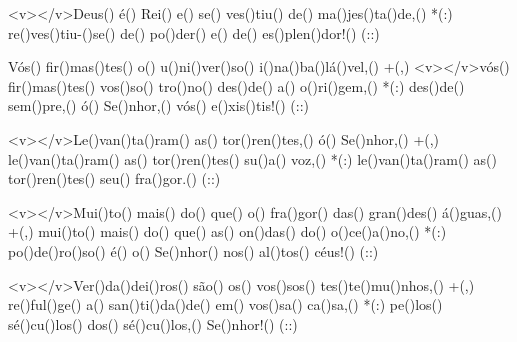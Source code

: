 <v></v>Deus() é() Rei() e() se() ves()tiu() de() ma()jes()ta()de,() *(:)
re()ves()tiu-()se() de() po()der() e() de() es()plen()dor!() (::)

Vós() fir()mas()tes() o() u()ni()ver()so() i()na()ba()lá()vel,() +(,)
<v></v>vós() fir()mas()tes() vos()so() tro()no() des()de() a() o()ri()gem,() *(:)
des()de() sem()pre,() ó() Se()nhor,() vós() e()xis()tis!() (::)

<v></v>Le()van()ta()ram() as() tor()ren()tes,() ó() Se()nhor,() +(,)
le()van()ta()ram() as() tor()ren()tes() su()a() voz,() *(:)
le()van()ta()ram() as() tor()ren()tes() seu() fra()gor.() (::)

<v></v>Mui()to() mais() do() que() o() fra()gor() das() gran()des() á()guas,() +(,)
mui()to() mais() do() que() as() on()das() do() o()ce()a()no,() *(:)
po()de()ro()so() é() o() Se()nhor() nos() al()tos() céus!() (::)

<v></v>Ver()da()dei()ros() são() os() vos()sos() tes()te()mu()nhos,() +(,)
re()ful()ge() a() san()ti()da()de() em() vos()sa() ca()sa,() *(:)
pe()los() sé()cu()los() dos() sé()cu()los,() Se()nhor!() (::)